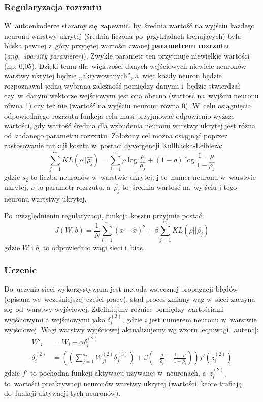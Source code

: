 \subsubsection{Regularyzacja rozrzutu}
W~autoenkoderze staramy się~zapewnić, by~średnia wartość na wyjściu każdego neuronu warstwy ukrytej
(średnia liczona po~przykładach trenujących) była bliska pewnej z~góry przyjętej wartości zwanej \textbf{parametrem
rozrzutu} (\textit{ang.~sparsity parameter})). Zwykle parametr ten przyjmuje niewielkie wartości (np. 0,05). Dzięki temu
dla~większości danych wejściowych niewiele neuronów warstwy ukrytej będzie ,,aktywowanych'', a~więc każdy neuron będzie
rozpoznawał jedną wybraną zależność pomiędzy danymi i~będzie stwierdzał czy~w~danym wektorze wejściowym jest ona obecna
(wartość na~wyjściu neuronu równa 1) czy też nie (wartość na wyjściu neuronu równa 0). W~celu osiągnięcia odpowiedniego
rozrzutu funkcja celu musi przyjmować odpowienio wyższe wartości, gdy wartość średnia dla wzbudenia neuronu warstwy
ukrytej jest różna od~zadanego parametru rozrzutu. Założony cel można osiągnąć poprzez zastosowanie funkcji kosztu
w~postaci dyvergencji Kullbacka-Leiblera:
\begin{equation*}
\sum\limits_{j=1}^{s_2}KL(\rho||\hat{\rho_j}) = \sum\limits_{j=1}^{s_2}\rho \log\frac{\rho}{\hat{\rho_j}} +
(1-\rho)\log\frac{1-\rho}{1-\hat{\rho_j}}
\end{equation*}
gdzie $s_2$ to liczba neuronów w~warstwie ukrytej, j to~numer neuronu w~warstwie ukrytej, $\rho$ to parametr rozrzutu,
a~$\hat{\rho_j}$ to~średnia wartość na~wyjściu j-tego neuronu wartstwy ukrytej.

Po~uwzględnieniu regularyzacji, funkcja kosztu przyjmie postać:
\begin{equation*}
J(W,b)=\frac{1}{N}\sum\limits_{i=1}^{s_1}(x-\hat{x})^2 + \beta\sum\limits_{j=1}^{s_2}KL(\rho||\hat{\rho_j})
\end{equation*}
gdzie $W$ i $b$, to odpowiednio wagi sieci i~bias.

\subsubsection{Uczenie}
Do~uczenia sieci wykorzystywana jest metoda wstecznej propagacji błędów (opisana we~wcześniejszej części pracy),
stąd proces zmiany wag w~sieci zaczyna się~od~warstwy wyjściowej. Zdefiniujmy różnicę pomiędzy wartościami wyjściowymi
a wejściowymi jako $\delta_i^{(3)}$, gdzie $i$ jest numerem neuronu w~warstwie wyjściowej.
Wagi warstwy wyjściowej aktualizujemy wg wzoru \ref{eqn:wagi_autenc}:
\begin{equation}
\begin{split}
W'_i &= W_i + \alpha\delta^{(2)}_i \\
\delta_i^{(2)} &= \left( \left( \sum\limits_{j=1}^{s_{2}} W^{(2)}_{ji} \delta^{(3)}_j \right)
+ \beta \left( - \frac{\rho}{\hat\rho_i} + \frac{1-\rho}{1-\hat\rho_i} \right) \right) f'(z^{(2)}_i)
\end{split}
\label{eqn:wagi_autenc}
\end{equation}
gdzie $f'$ to pochodna funkcji aktywacji używanej w~neuronach, a~$z^{(2)}_i$, to~wartości preaktywacji neuronów warstwy
ukrytej (wartości, które trafiają do~funkcji aktywacji tych neuronów).

